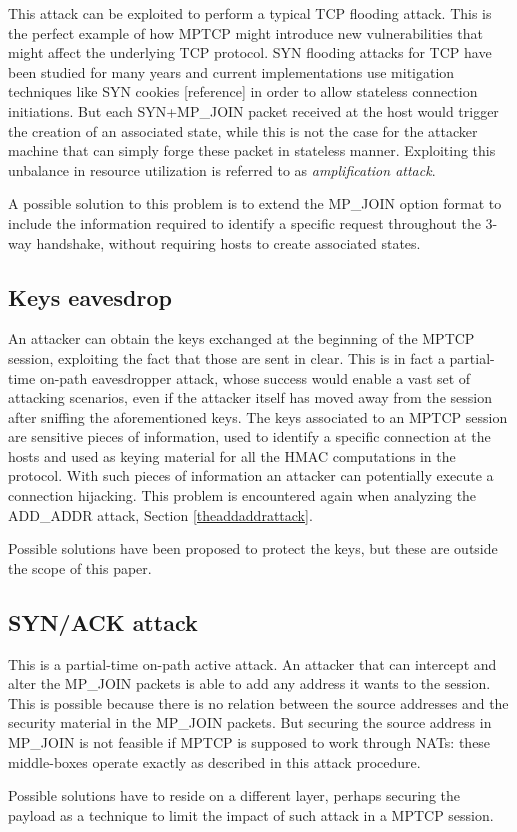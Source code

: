 This attack can be exploited to perform a typical TCP flooding attack. This is the perfect example of how MPTCP might introduce new vulnerabilities that might affect the underlying TCP protocol. 
SYN flooding attacks for TCP have been studied for many years and current implementations use mitigation techniques like SYN cookies [reference] in order to allow stateless connection initiations. But each SYN+MP\_JOIN packet received at the host would trigger the creation of an associated state, while this is not the case for the attacker machine that can simply forge these packet in stateless manner. Exploiting this unbalance in resource utilization is referred to as \textit{amplification attack}.

A possible solution to this problem is to extend the MP\_JOIN option format to include the information required to identify a specific request throughout the 3-way handshake, without requiring hosts to create associated states.

\subsection{Keys eavesdrop}
An attacker can obtain the keys exchanged at the beginning of the MPTCP session, exploiting the fact that those are sent in clear. This is in fact a partial-time on-path eavesdropper attack, whose success would enable a vast set of attacking scenarios, even if the attacker itself has moved away from the session after sniffing the aforementioned keys.
The keys associated to an MPTCP session are sensitive pieces of information, used to identify a specific connection at the hosts and used as keying material for all the HMAC computations in the protocol. With such pieces of information an attacker can potentially execute a connection hijacking. This problem is encountered again when analyzing the ADD\_ADDR attack, Section \ref{theaddaddrattack}.

Possible solutions have been proposed to protect the keys, but these are outside the scope of this paper.

\subsection{SYN/ACK attack}
This is a partial-time on-path active attack. An attacker that can intercept and alter the MP\_JOIN packets is able to add any address it wants to the session. This is possible because there is no relation between the source addresses and the security material in the MP\_JOIN packets. But securing the source address in MP\_JOIN is not feasible if MPTCP is supposed to work through NATs: these middle-boxes operate exactly as described in this attack procedure. 

Possible solutions have to reside on a different layer, perhaps securing the payload as a technique to limit the impact of such attack in a MPTCP session.

